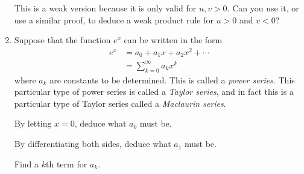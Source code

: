 \begin{enumerate}
  This is a weak version because it is only valid for \(u, v > 0\). Can you use
  it, or use a similar proof, to deduce a weak product rule for
  \(u > 0\) and \(v < 0\)?
 \item
  Suppose that the function \(e^x\) can be written in the form
  \begin{align*}
   e^x
    &= a_0 + a_1 x + a_2 x^2 + \dotsb \\
    &= \sum_{k = 0}^\infty a_k x^k
  \end{align*}
  where \(a_k\) are constants to be determined. This is called a
  \emph{power series}. This particular type of power series is called a
  \emph{Taylor series}, and in fact this is a particular type of Taylor series
  called a \emph{Maclaurin series}.

  By letting \(x = 0\), deduce what \(a_0\) must be.

  By differentiating both sides, deduce what \(a_1\) must be.

  Find a \(k\)th term for \(a_k\).


\end{enumerate}
